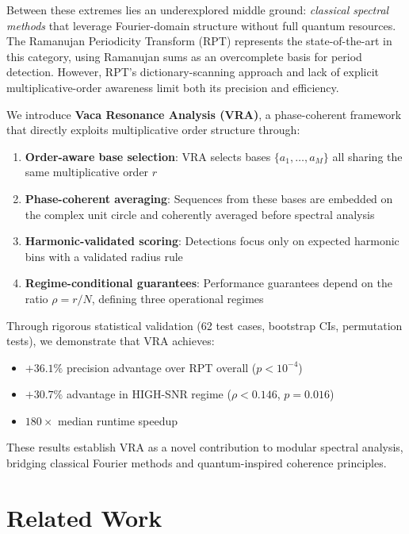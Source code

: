 \documentclass[conference]{IEEEtran}
\begin{document}
Between these extremes lies an underexplored middle ground: \emph{classical spectral methods} that leverage Fourier-domain structure without full quantum resources. The Ramanujan Periodicity Transform (RPT)\cite{vaidyanathan2014ramanujan,planat2002ramanujan} represents the state-of-the-art in this category, using Ramanujan sums as an overcomplete basis for period detection. However, RPT's dictionary-scanning approach and lack of explicit multiplicative-order awareness limit both its precision and efficiency.

We introduce \textbf{Vaca Resonance Analysis (VRA)}, a phase-coherent framework that directly exploits multiplicative order structure through:

\begin{enumerate}
    \item \textbf{Order-aware base selection}: VRA selects bases $\{a_1, \ldots, a_M\}$ all sharing the same multiplicative order $r$
    \item \textbf{Phase-coherent averaging}: Sequences from these bases are embedded on the complex unit circle and coherently averaged before spectral analysis
    \item \textbf{Harmonic-validated scoring}: Detections focus only on expected harmonic bins with a validated radius rule
    \item \textbf{Regime-conditional guarantees}: Performance guarantees depend on the ratio $\rho = r/N$, defining three operational regimes
\end{enumerate}

Through rigorous statistical validation (62 test cases, bootstrap CIs, permutation tests), we demonstrate that VRA achieves:
\begin{itemize}
    \item $+36.1\%$ precision advantage over RPT overall ($p < 10^{-4}$)
    \item $+30.7\%$ advantage in HIGH-SNR regime ($\rho < 0.146$, $p = 0.016$)
    \item $180\times$ median runtime speedup
\end{itemize}

These results establish VRA as a novel contribution to modular spectral analysis, bridging classical Fourier methods and quantum-inspired coherence principles.


\section{Related Work}
\end{document}
